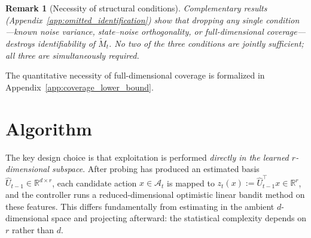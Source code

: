 \documentclass{article}
\newcommand{\R}{\mathbb{R}}
\newcommand{\cA}{\mathcal{A}}
\newtheorem{remark}{Remark}
\begin{document}
\begin{remark}[Necessity of structural conditions]
\label{rem:necessity_compact}
Complementary results (Appendix~\ref{app:omitted_identification}) show that dropping any single condition---known noise variance, state--noise orthogonality, or full-dimensional coverage---destroys identifiability of $\widetilde{M}_t$. No two of the three conditions are jointly sufficient; all three are simultaneously required.
\end{remark}

The quantitative necessity of full-dimensional coverage is formalized in Appendix~\ref{app:coverage_lower_bound}.

\section{Algorithm}
\label{sec:algorithm}

The key design choice is that exploitation is performed \emph{directly in the learned $r$-dimensional subspace}.
After probing has produced an estimated basis $\widehat U_{t-1}\in\R^{d\times r}$, each candidate action $x\in\cA_t$ is mapped to $z_t(x) := \widehat U_{t-1}^\top x \in \R^r$,
and the controller runs a reduced-dimensional optimistic linear bandit method on these features.
This differs fundamentally from estimating in the ambient $d$-dimensional space and projecting afterward: the statistical complexity depends on $r$ rather than $d$.
\end{document}

